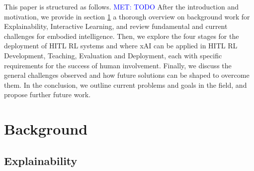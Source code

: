 \documentclass[twoside,11pt]{article}
\newcommand{\sd}[1]{\textcolor{red}{[#1 \textsc{--Srijita}]}}
\newcommand{\MET}[1]{\textcolor{blue}{MET: #1}}
\begin{document}



This paper is structured as follows. \MET{TODO}
After the introduction and motivation, we provide in section \ref{sec:background} a thorough overview on background work for Explainability, Interactive Learning, and review fundamental and current challenges for embodied intelligence. Then, we explore the four stages for the deployment of HITL RL systems and where xAI can be applied in HITL RL Development, Teaching, Evaluation and Deployment, each with specific requirements for the success of human involvement. Finally, we discuss the general challenges observed and how future solutions can be shaped to overcome them. In the conclusion, we outline current problems and goals in the field, and propose further future work.

\section{Background}
\label{sec:background}

\subsection{Explainability}
\end{document}
